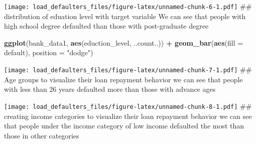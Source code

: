 \documentclass[]{article}
\newenvironment{Shaded}{\begin{snugshade}}{\end{snugshade}}
\newcommand{\DataTypeTok}[1]{\textcolor[rgb]{0.13,0.29,0.53}{#1}}
\newcommand{\DecValTok}[1]{\textcolor[rgb]{0.00,0.00,0.81}{#1}}
\newcommand{\KeywordTok}[1]{\textcolor[rgb]{0.13,0.29,0.53}{\textbf{#1}}}
\newcommand{\NormalTok}[1]{#1}
\newcommand{\OperatorTok}[1]{\textcolor[rgb]{0.81,0.36,0.00}{\textbf{#1}}}
\newcommand{\StringTok}[1]{\textcolor[rgb]{0.31,0.60,0.02}{#1}}
\begin{document}
\texttt{[image: load\_defaulters\_files/figure-latex/unnamed-chunk-6-1.pdf]}
\#\# distribution of eduation level with target variable We can see that
people with high school degree defaulted than those with post-graduate
degree

\begin{Shaded}
\begin{Highlighting}[]
\KeywordTok{ggplot}\NormalTok{(bank_data1, }\KeywordTok{aes}\NormalTok{(eduction_level, ..count..)) }\OperatorTok{+}\StringTok{ }\KeywordTok{geom_bar}\NormalTok{(}\KeywordTok{aes}\NormalTok{(}\DataTypeTok{fill =}\NormalTok{ default), }\DataTypeTok{position =} \StringTok{"dodge"}\NormalTok{)}
\end{Highlighting}
\end{Shaded}

\texttt{[image: load\_defaulters\_files/figure-latex/unnamed-chunk-7-1.pdf]}
\#\# Age groups to visualize their loan repayment behavior we can see
that people with less than 26 years defaulted more than those with
advance ages

\begin{Shaded}
\end{Shaded}

\texttt{[image: load\_defaulters\_files/figure-latex/unnamed-chunk-8-1.pdf]}
\#\# creating income categories to visualize their loan repayment
behavior we can see that people under the income category of low income
defaulted the most than those in other categories
\end{document}
